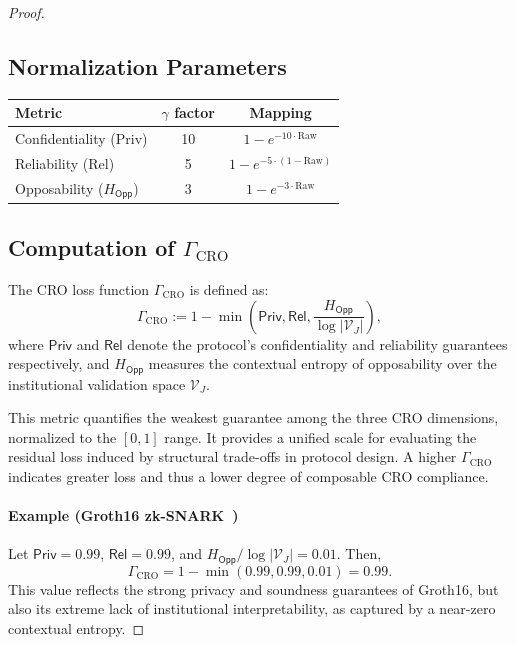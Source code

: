\documentclass[preprint,12pt]{elsarticle}
\newcommand{\Prv}{\mathsf{Priv}}
\newcommand{\Rel}{\mathsf{Rel}}
\begin{document}
\begin{proof}
            \subsection{Normalization Parameters}\label{app:Normalization}
                \begin{table}[h]
                    \centering
                    \begin{tabular}{lcc}
                        \toprule
                        \textbf{Metric} & \textbf{$\gamma$ factor} & \textbf{Mapping} \\
                        \midrule
                        Confidentiality (Priv) & 10 & $1 - e^{-10\cdot \mathrm{Raw}}$ \\
                        Reliability (Rel) & 5 & $1 - e^{-5\cdot (1-\mathrm{Raw})}$ \\
                        Opposability ($H_{\mathsf{Opp}}$) & 3 & $1 - e^{-3\cdot \mathrm{Raw}}$ \\
                        \bottomrule
                    \end{tabular}
                \end{table}

            \subsection{Computation of $\Gamma_{\text{CRO}}$}\label{app:gamma_cro}

                The CRO loss function $\Gamma_{\text{CRO}}$ is defined as:
                \[
                \Gamma_{\text{CRO}} := 1 - \min\left(\Prv, \Rel, \frac{H_{\mathsf{Opp}}}{\log |\mathcal{V}_J|} \right),
                \]
                where $\Prv$ and $\Rel$ denote the protocol's confidentiality and reliability guarantees respectively, and $H_{\mathsf{Opp}}$ measures the contextual entropy of opposability over the institutional validation space $\mathcal{V}_J$.

                This metric quantifies the weakest guarantee among the three CRO dimensions, normalized to the $[0,1]$ range. It provides a unified scale for evaluating the residual loss induced by structural trade-offs in protocol design. A higher $\Gamma_{\text{CRO}}$ indicates greater loss and thus a lower degree of composable CRO compliance.

                \paragraph{Example (Groth16 zk-SNARK~\cite{Groth2016})}
                Let $\Prv = 0.99$, $\Rel = 0.99$, and $H_{\mathsf{Opp}} / \log |\mathcal{V}_J| = 0.01$. Then,
                \[
                \Gamma_{\text{CRO}} = 1 - \min(0.99, 0.99, 0.01) = 0.99.
                \]
                This value reflects the strong privacy and soundness guarantees of Groth16, but also its extreme lack of institutional interpretability, as captured by a near-zero contextual entropy.


\end{proof}
\end{document}
